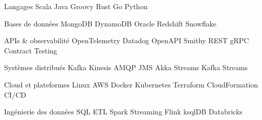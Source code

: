 
\begin{cvskills}
    \cvskill
    {Langages}
    {Scala {} Java {} Groovy {} Rust {} Go {} Python}

    \cvskill
    {Bases de données}
    {MongoDB {} DynamoDB {} Oracle {} Redshift {} Snowflake}

    \cvskill
    {APIs \& observabilité}
    {OpenTelemetry {} Datadog {} OpenAPI {} Smithy {} REST {} gRPC {} Contract Testing}

    \cvskill
    {Systèmes distribués}
    {Kafka {} Kinesis {} AMQP {} JMS {} Akka Streams {} Kafka Streams}

    \cvskill
    {Cloud et plateformes}
    {Linux {} AWS {} Docker {} Kubernetes {} Terraform {} CloudFormation {} CI/CD}

    \cvskill
    {Ingénierie des données}
    {SQL {} ETL {} Spark Streaming {} Flink {} ksqlDB {} Databricks}


\end{cvskills}
